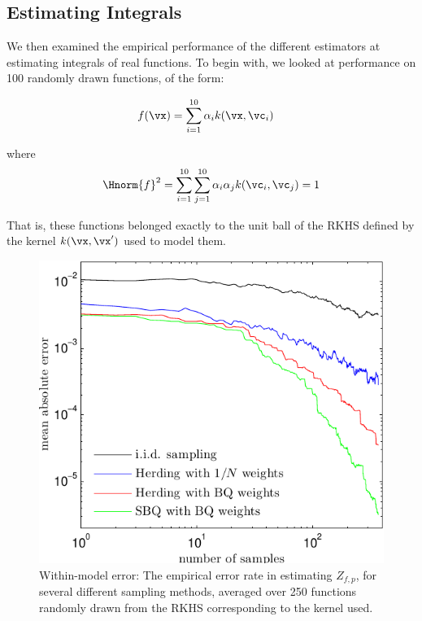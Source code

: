 \subsection{Estimating Integrals}


We then examined the empirical performance of the different estimators at estimating integrals of real functions. To begin with, we looked at performance on 100 randomly drawn functions, of the form:

\begin{align}
f(\vx) & = \sum_{i=1}^{10} \alpha_i k(\vx, \vc_i)
\end{align}

where
\begin{align}
\Hnorm{f}^2 = \sum_{i=1}^{10} \sum_{j=1}^{10} \alpha_i \alpha_j k(\vc_i, \vc_j) = 1
\end{align}

That is, these functions belonged exactly to the unit ball of the RKHS defined by the kernel $k(\vx, \vx')$ used to model them.

\begin{figure}
\includegraphics[width=\columnwidth]{figs/herding/error_curve_rkhs_400_v4}
\caption[Empirical error of Bayesian quadrature, herding and random sampling]{Within-model error: The empirical error rate in estimating $Z_{f,p}$, for several different sampling methods, averaged over 250 functions randomly drawn from the RKHS corresponding to the kernel used.}
\label{fig:error_curve}
\end{figure}

